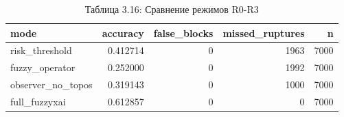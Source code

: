 \begin{table}[htbp]
\caption{Таблица 3.16: Сравнение режимов R0-R3}
\label{tab:3_16}
\begin{tabular}{lrrrr}
\toprule
mode & accuracy & false\_blocks & missed\_ruptures & n \\
\midrule
risk\_threshold & 0.412714 & 0 & 1963 & 7000 \\
fuzzy\_operator & 0.252000 & 0 & 1992 & 7000 \\
observer\_no\_topos & 0.319143 & 0 & 1000 & 7000 \\
full\_fuzzyxai & 0.612857 & 0 & 0 & 7000 \\
\bottomrule
\end{tabular}
\end{table}
